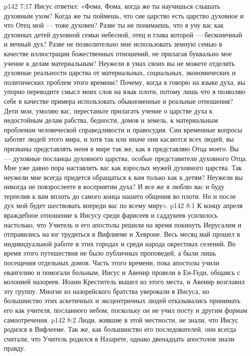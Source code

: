 \vs p142 7:17 Иисус ответил: «Фома, Фома, когда же ты научишься слышать духовным ухом? Когда же ты поймешь, что сие царство есть царство духовное и что Отец мой --- тоже духовен? Разве ты не понимаешь, что я учу вас как духовных детей духовной семьи небесной, отец и глава которой --- бесконечный и вечный дух? Разве не позволительно мне использовать земную семью в качестве иллюстрации божественных отношений, не прилагая буквально мое учение к делам материальным? Неужели в умах своих вы не можете отделить духовные реальности царства от материальных, социальных, экономических и политических проблем этого времени? Почему, когда я говорю на языке духа, вы упорно переводите смысл моих слов на язык плоти, потому лишь что я позволяю себе в качестве примера использовать обыкновенные и реальные отношения? Дети мои, умоляю вас, перестаньте прилагать учение о царстве духа к недостойным делам рабства, бедности, домов и земель, к материальным проблемам человеческой справедливости и правосудия. Сии временные вопросы заботят людей этого мира, и хотя так или иначе они касаются всех людей, вы призваны представлять меня в мире так же, как я представляю Отца моего. Вы --- духовные посланцы духовного царства, особые представители духовного Отца. Мне уже давно пора наставлять вас как взрослых мужей духовного царства. Так неужели мне всегда придется обращаться к вам только как к детям? Неужели вы никогда не повзрослеете в восприятии духа? И все же я люблю вас и буду терпелив к вам вплоть до самого конца нашего общения во плоти. Но и после дух мой будет шествовать впереди вас по всему миру».
\vs p142 8:1 К концу апреля враждебное отношение к Иисусу среди фарисеев и саддукеев усилилось настолько, что Учитель и его апостолы решили на время покинуть Иерусалим и отправились на юг трудиться в Вифлиеме и Хевроне. Весь месяц май прошел в индивидуальной работе в этих городах и среди народа окрестных селений. Во время этого путешествия не было публичных проповедей, а были лишь посещения отдельных домов. Часть этого времени, пока апостолы учили евангелию и помогали больным, Иисус и Авенир провели в Ен\hyp{}Геди, общаясь с колонией назореев. Иоанн Креститель вышел из этого места, и Авенир возглавил эту группу. Многие из назорейского братства уверовали в Иисуса, но большинство этих аскетичных и эксцентричных людей отказывались принимать его как учителя, посланного небом, поскольку он не учил посту и другим формам самоотречения.
\vs p142 8:2 Люди, жившие в этой местности, не знали, что Иисус родился в Вифлееме. Так же, как большинство его последователей, они всегда считали, что Учитель родился в Назарете, однако двенадцать апостолов знали правду.
